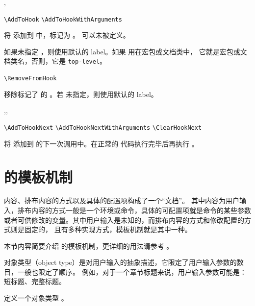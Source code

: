 \documentclass{cusdoc}
\begin{document}
\begin{function}[module=hook]{\AddToHook,\AddToHookWithArguments}
  \begin{syntax}
    \verb|\AddToHook|                
    \verb|\AddToHookWithArguments|   
  \end{syntax}
将  添加到  中，标记为 。 可以未被定义。

如果未指定 ，则使用默认的 label。如果  用在宏包或文档类中，
它就是宏包或文档类名，否则，它是 \texttt{top-level}。
\end{function}

\begin{function}[module=hook]{\RemoveFromHook}
  \begin{syntax}
    \verb|\RemoveFromHook|  
  \end{syntax}
移除标记了  的 。若  未指定，则使用默认的 label。
\end{function}

\begin{function}[module=hook]{\AddToHookNext,\AddToHookNextWithArguments,\ClearHookNext}
  \begin{syntax}
    \verb|\AddToHookNext|               
    \verb|\AddToHookNextWithArguments|  
    \verb|\ClearHookNext| 
  \end{syntax}
将  添加到  的下一次调用中。在正常的  代码执行完毕后再执行 。
\end{function}


\section{\LaTeXe 的模板机制}\label{sec:lttemplates}

内容、排布内容的方式以及具体的配置项构成了一个“文档”。
其中内容为用户输入，排布内容的方式一般是一个环境或命令，具体的可配置项就是命令的某些参数
或者可供修改的变量。其中用户输入是未知的，而排布内容的方式和修改配置的方式则是固定的，
且有多种实现方式，模板机制就是其中一种。

本节内容简要介绍 \LaTeXe 的模板机制，更详细的用法请参考 。

对象类型（object type）是对用户输入的抽象描述，它限定了用户输入参数的数目，一般也限定了顺序。
例如，对于一个章节标题来说，用户输入参数可能是：短标题、完整标题。
\begin{function}[module=lttemplates]{\NewTemplateType}
  \begin{syntax}
    \V\NewTemplateType {} 
  \end{syntax}
定义一个对象类型 。
\end{function}
\end{document}

